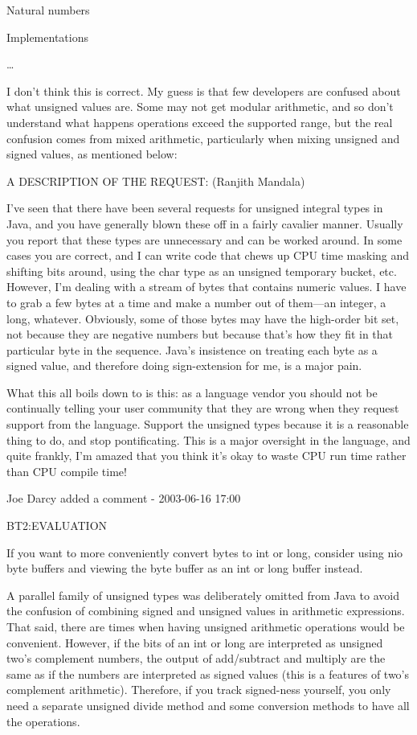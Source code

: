 \documentclass[12pt]{PalisadesLakesBook}
\begin{document}
\begin{plSection}{Natural numbers}
\begin{plSection}{Implementations}
\begin{plQuote}
\ldots
\end{plQuote}

I don't think this is correct.
My guess is that few developers are confused about
what unsigned values are.
Some may not get modular arithmetic,
and so don't understand what happens
operations exceed the supported range,
but the real confusion comes from mixed arithmetic, particularly
when mixing unsigned and signed values, as mentioned below:

\begin{plQuote}
{}{}%
{%
A DESCRIPTION OF THE REQUEST: (Ranjith Mandala)

I've seen that there have been several requests 
for unsigned integral types in Java, 
and you have generally blown these off 
in a fairly cavalier manner. 
Usually you report that these types are unnecessary 
and can be worked around. In some cases you are correct, 
and I can write code that chews up CPU time 
masking and shifting bits around, 
using the char type as an unsigned temporary bucket, etc. 
However, I'm dealing with a stream of bytes 
that contains numeric values. 
I have to grab a few bytes at a time 
and make a number out of them---an integer, a long, whatever. 
Obviously, some of those bytes may have the high-order bit set, 
not because they are negative numbers 
but because that's how they fit in that particular byte 
in the sequence. 
Java's insistence on treating each byte as a signed value, 
and therefore doing sign-extension for me, is a major pain.

What this all boils down to is this: 
as a language vendor you should not be continually telling 
your user community that they are wrong 
when they request support from the language. 
Support the unsigned types because it is a reasonable thing to do, 
and stop pontificating. 
This is a major oversight in the language, and quite frankly, 
I'm amazed that you think it's okay to waste CPU run time 
rather than CPU compile time!

Joe Darcy added a comment - 2003-06-16 17:00

BT2:EVALUATION

If you want to more conveniently convert bytes to int or long, 
consider using nio byte buffers and viewing the byte buffer 
as an int or long buffer instead.

A parallel family of unsigned types was deliberately 
omitted from Java to avoid the confusion 
of combining signed and unsigned values in arithmetic expressions. 
That said, there are times
 when having unsigned arithmetic operations would be convenient. 
 However, if the bits of an int or long are interpreted 
 as unsigned two's complement numbers, 
 the output of add/subtract and multiply are 
 the same as if the numbers are interpreted as signed values 
 (this is a features of two's complement arithmetic). 
 Therefore, if you track signed-ness yourself, 
 you only need a separate unsigned divide method 
 and some conversion methods to have all the operations.}
\end{plQuote}


\end{plSection}
\end{plSection}
\end{document}
